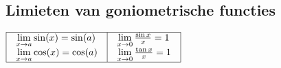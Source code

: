 \documentclass[a5paper]{article}
\begin{document}
\subsection{Limieten van goniometrische functies}

$\begin{array}{|l|l|}
\hline
\begin{array}{l}
\mathop {\lim }\limits_{x \to a} \sin (x) = \sin (a)\\
\mathop {\lim }\limits_{x \to a} \cos (x) = \cos (a)
\end{array}
&
\begin{array}{l}
\mathop {\lim }\limits_{x \to 0} \frac{{\sin x}}{x} = 1\\
\mathop {\lim }\limits_{x \to 0} \frac{{\tan x}}{x} = 1
\end{array} \\
\hline
\end{array}$
\normalsize

\newpage
\end{document}
